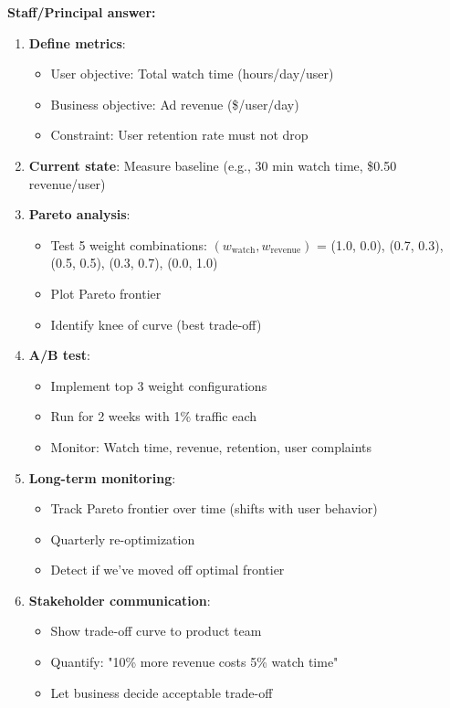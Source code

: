 \documentclass[10pt]{article}
\begin{document}
\textbf{Staff/Principal answer:}
\begin{enumerate}
\item \textbf{Define metrics}:
\begin{itemize}
\item User objective: Total watch time (hours/day/user)
\item Business objective: Ad revenue (\$/user/day)
\item Constraint: User retention rate must not drop
\end{itemize}

\item \textbf{Current state}: Measure baseline (e.g., 30 min watch time, \$0.50 revenue/user)

\item \textbf{Pareto analysis}:
\begin{itemize}
\item Test 5 weight combinations: $(w_{\text{watch}}, w_{\text{revenue}})$ = (1.0, 0.0), (0.7, 0.3), (0.5, 0.5), (0.3, 0.7), (0.0, 1.0)
\item Plot Pareto frontier
\item Identify knee of curve (best trade-off)
\end{itemize}

\item \textbf{A/B test}:
\begin{itemize}
\item Implement top 3 weight configurations
\item Run for 2 weeks with 1\% traffic each
\item Monitor: Watch time, revenue, retention, user complaints
\end{itemize}

\item \textbf{Long-term monitoring}:
\begin{itemize}
\item Track Pareto frontier over time (shifts with user behavior)
\item Quarterly re-optimization
\item Detect if we've moved off optimal frontier
\end{itemize}

\item \textbf{Stakeholder communication}:
\begin{itemize}
\item Show trade-off curve to product team
\item Quantify: "10\% more revenue costs 5\% watch time"
\item Let business decide acceptable trade-off
\end{itemize}
\end{enumerate}
\end{document}
